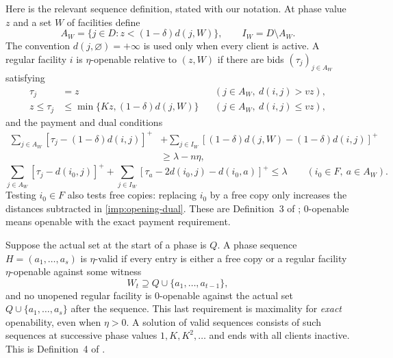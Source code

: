 Here is the relevant sequence definition, stated with our notation.
At phase value $z$ and a set $W$ of facilities define
\[
 A_W=\{j\in D:z<(1-\delta)d(j,W)\},\qquad I_W=D\setminus A_W.
\]
The convention $d(j,\varnothing)=+\infty$ is used only when every client
is active.  A regular facility $i$ is $\eta$-openable relative to $(z,W)$
if there are bids $(\tau_j)_{j\in A_W}$ satisfying
\begin{align}
 \tau_j&=z &&(j\in A_W,\ d(i,j)>vz),\label{imp:near-bids}\\
 z\le\tau_j&\le\min\{Kz,(1-\delta)d(j,W)\}
       &&(j\in A_W,\ d(i,j)\le vz),\label{imp:bid-cap}
\end{align}
and the payment and dual conditions
\begin{equation}\label{imp:opening-payment}
 \begin{split}
 \sum_{j\in A_W}[\tau_j-(1-\delta)d(i,j)]^+
  &+\sum_{j\in I_W}[(1-\delta)d(j,W)-(1-\delta)d(i,j)]^+\\
  &\ge\lambda-n\eta,
 \end{split}
\end{equation}
\begin{equation}\label{imp:opening-dual}
 \sum_{j\in A_W}[\tau_j-d(i_0,j)]^+
  +\sum_{j\in I_W}[\tau_a-2d(i_0,j)-d(i_0,a)]^+
   \le\lambda
 \qquad(i_0\in F,\ a\in A_W).
\end{equation}
Testing $i_0\in F$ also tests free copies: replacing $i_0$ by a free
copy only increases the distances subtracted in
\eqref{imp:opening-dual}.  These are Definition~3 of
\cite{CGLSS2026}; $0$-openable means openable with the exact payment
requirement.

Suppose the actual set at the start of a phase is $Q$.  A phase sequence
$H=(a_1,\ldots,a_s)$ is $\eta$-valid if every entry is either a free
copy or a regular facility $\eta$-openable against some witness
\[
 W_t\supseteq Q\cup\{a_1,\ldots,a_{t-1}\},
\]
and no unopened regular facility is $0$-openable against the actual set
$Q\cup\{a_1,\ldots,a_s\}$ after the sequence.  This last requirement
is maximality for \emph{exact} openability, even when $\eta>0$.
A solution of valid sequences consists of such sequences at successive
phase values $1,K,K^2,\ldots$ and ends with all clients inactive.
This is Definition~4 of \cite{CGLSS2026}.

